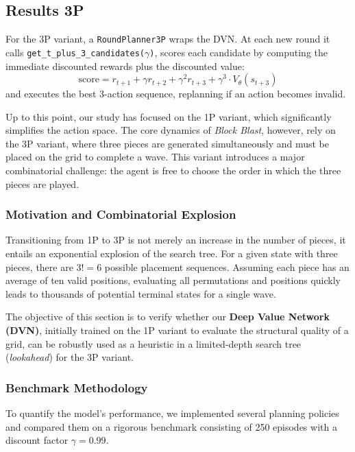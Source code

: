 \documentclass[10pt]{article}
\begin{document}
\subsection{Results 3P}

For the 3P variant, a \texttt{RoundPlanner3P} wraps the DVN. At each new round it calls \texttt{get\_t\_plus\_3\_candidates($\gamma$)}, scores each candidate by computing the immediate discounted rewards plus the discounted value:
\[
\text{score} = r_{t+1} + \gamma r_{t+2} + \gamma^2 r_{t+3} + \gamma^3 \cdot V_\theta(s_{t+3})
\]
and executes the best 3-action sequence, replanning if an action becomes invalid.


Up to this point, our study has focused on the 1P variant, which significantly simplifies the action space. The core dynamics of \emph{Block Blast}, however, rely on the 3P variant, where three pieces are generated simultaneously and must be placed on the grid to complete a wave. This variant introduces a major combinatorial challenge: the agent is free to choose the order in which the three pieces are played.

\subsubsection{Motivation and Combinatorial Explosion}

Transitioning from 1P to 3P is not merely an increase in the number of pieces, it entails an exponential explosion of the search tree. For a given state with three pieces, there are $3! = 6$ possible placement sequences. Assuming each piece has an average of ten valid positions, evaluating all permutations and positions quickly leads to thousands of potential terminal states for a single wave.

The objective of this section is to verify whether our \textbf{Deep Value Network (DVN)}, initially trained on the 1P variant to evaluate the structural quality of a grid, can be robustly used as a heuristic in a limited-depth search tree (\emph{lookahead}) for the 3P variant.

\subsubsection{Benchmark Methodology}

To quantify the model's performance, we implemented several planning policies and compared them on a rigorous benchmark consisting of 250 episodes  with a discount factor $\gamma = 0.99$. 
\end{document}
